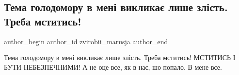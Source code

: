  
 
 
 
 
 
\subsection{Тема голодомору в мені викликає лише злість. Треба мститись!}
\label{sec:28_11_2020.fb.zvirobii_marusja.2.golodomor_mest}
\ifcmt
	author_begin
   author_id zvirobii_marusja
	author_end
\fi

Тема голодомору в мені викликає лише злість. Треба мститись! МСТИТИСЬ І БУТИ
НЕБЕЗПЕЧНИМИ! А не оце все, як в нас, шо попало. В мене все.
